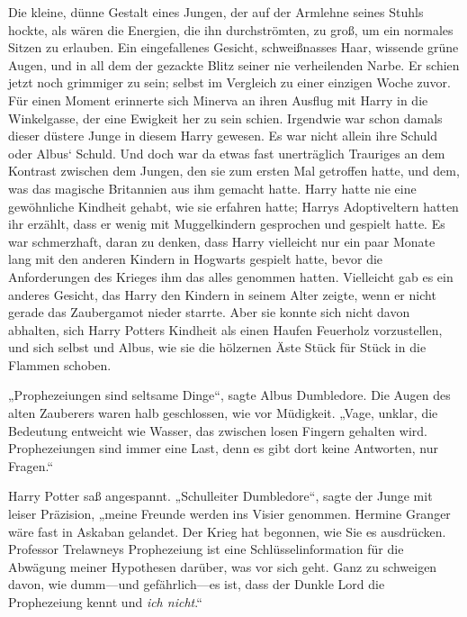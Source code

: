 Die kleine, dünne Gestalt eines Jungen, der auf der Armlehne seines Stuhls hockte, als wären die Energien, die ihn durchströmten, zu groß, um ein normales Sitzen zu erlauben. Ein eingefallenes Gesicht, schweißnasses Haar, wissende grüne Augen, und in all dem der gezackte Blitz seiner nie verheilenden Narbe. Er schien jetzt noch grimmiger zu sein; selbst im Vergleich zu einer einzigen Woche zuvor. Für einen Moment erinnerte sich Minerva an ihren Ausflug mit Harry in die Winkelgasse, der eine Ewigkeit her zu sein schien. Irgendwie war schon damals dieser düstere Junge in diesem Harry gewesen. Es war nicht allein ihre Schuld oder Albus‘ Schuld. Und doch war da etwas fast unerträglich Trauriges an dem Kontrast zwischen dem Jungen, den sie zum ersten Mal getroffen hatte, und dem, was das magische Britannien aus ihm gemacht hatte. Harry hatte nie eine gewöhnliche Kindheit gehabt, wie sie erfahren hatte; Harrys Adoptiveltern hatten ihr erzählt, dass er wenig mit Muggelkindern gesprochen und gespielt hatte. Es war schmerzhaft, daran zu denken, dass Harry vielleicht nur ein paar Monate lang mit den anderen Kindern in Hogwarts gespielt hatte, bevor die Anforderungen des Krieges ihm das alles genommen hatten. Vielleicht gab es ein anderes Gesicht, das Harry den Kindern in seinem Alter zeigte, wenn er nicht gerade das Zaubergamot nieder starrte. Aber sie konnte sich nicht davon abhalten, sich Harry Potters Kindheit als einen Haufen Feuerholz vorzustellen, und sich selbst und Albus, wie sie die hölzernen Äste Stück für Stück in die Flammen schoben.

„Prophezeiungen sind seltsame Dinge“, sagte Albus Dumbledore. Die Augen des alten Zauberers waren halb geschlossen, wie vor Müdigkeit. „Vage, unklar, die Bedeutung entweicht wie Wasser, das zwischen losen Fingern gehalten wird. Prophezeiungen sind immer eine Last, denn es gibt dort keine Antworten, nur Fragen.“

Harry Potter saß angespannt. „Schulleiter Dumbledore“, sagte der Junge mit leiser Präzision, „meine Freunde werden ins Visier genommen. Hermine Granger wäre fast in Askaban gelandet. Der Krieg hat begonnen, wie Sie es ausdrücken. Professor Trelawneys Prophezeiung ist eine Schlüsselinformation für die Abwägung meiner Hypothesen darüber, was vor sich geht. Ganz zu schweigen davon, wie dumm—und gefährlich—es ist, dass der Dunkle Lord die Prophezeiung kennt und \emph{ich nicht}.“

